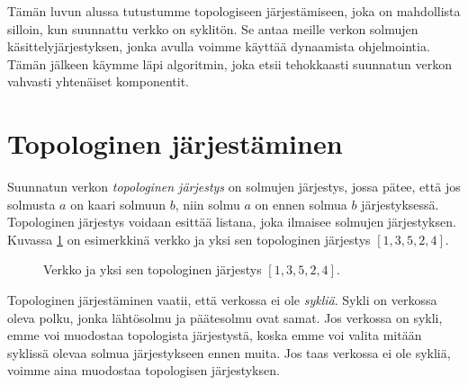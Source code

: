 Tämän luvun alussa tutustumme topologiseen järjestämiseen,
joka on mahdollista silloin, kun suunnattu verkko on syklitön.
Se antaa meille verkon solmujen käsittelyjärjestyksen,
jonka avulla voimme käyttää dynaamista ohjelmointia.
Tämän jälkeen käymme läpi algoritmin, joka etsii tehokkaasti
suunnatun verkon vahvasti yhtenäiset komponentit.

\section{Topologinen järjestäminen}

Suunnatun verkon \emph{topologinen järjestys} on solmujen järjestys,
jossa pätee, että jos solmusta $a$ on kaari solmuun $b$,
niin solmu $a$ on ennen solmua $b$ järjestyksessä.
Topologinen järjestys voidaan esittää listana,
joka ilmaisee solmujen järjestyksen.
Kuvassa \ref{fig:topjar} on esimerkkinä verkko ja yksi sen topologinen
järjestys $[1,3,5,2,4]$.

\begin{figure}
\center
\begin{center}
\end{center}
\caption{Verkko ja yksi sen topologinen järjestys $[1,3,5,2,4]$.}
\label{fig:topjar}
\end{figure}

Topologinen järjestäminen vaatii, että verkossa ei ole \emph{sykliä}.
Sykli on verkossa oleva polku, jonka lähtösolmu ja
päätesolmu ovat samat.
Jos verkossa on sykli, emme voi muodostaa topologista
järjestystä, koska emme voi valita mitään syklissä
olevaa solmua järjestykseen ennen muita.
Jos taas verkossa ei ole sykliä,
voimme aina muodostaa topologisen järjestyksen.

